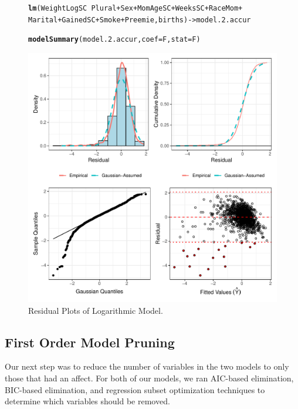 \documentclass{article}\usepackage[]{graphicx}\usepackage[]{xcolor}
\makeatletter
\def\maxwidth{ %
  \ifdim\Gin@nat@width>\linewidth
    \linewidth
  \else
    \Gin@nat@width
  \fi
}
\newcommand{\hlopt}[1]{\textcolor[rgb]{0,0,0}{#1}}%
\newcommand{\hlstd}[1]{\textcolor[rgb]{0.345,0.345,0.345}{#1}}%
\newcommand{\hlkwb}[1]{\textcolor[rgb]{0.69,0.353,0.396}{#1}}%
\newcommand{\hlkwc}[1]{\textcolor[rgb]{0.333,0.667,0.333}{#1}}%
\newcommand{\hlkwd}[1]{\textcolor[rgb]{0.737,0.353,0.396}{\textbf{#1}}}%
\newenvironment{kframe}{%
 \def\at@end@of@kframe{}%
 \ifinner\ifhmode%
  \def\at@end@of@kframe{\end{minipage}}%
  \begin{minipage}{\columnwidth}%
 \fi\fi%
 \def\FrameCommand##1{\hskip\@totalleftmargin \hskip-\fboxsep
 \colorbox{shadecolor}{##1}\hskip-\fboxsep
     \hskip-\linewidth \hskip-\@totalleftmargin \hskip\columnwidth}%
 \MakeFramed {\advance\hsize-\width
   \@totalleftmargin\z@ \linewidth\hsize
   \@setminipage}}%
 {\par\unskip\endMakeFramed%
 \at@end@of@kframe}
\newenvironment{knitrout}{}{} %
\makeatother
\begin{document}
\begin{figure}
\begin{knitrout}
\color{fgcolor}\begin{kframe}
\begin{alltt}
\hlkwd{lm}\hlstd{(WeightLogSC} \hlopt{~} \hlstd{Plural} \hlopt{+} \hlstd{Sex} \hlopt{+} \hlstd{MomAgeSC} \hlopt{+} \hlstd{WeeksSC} \hlopt{+} \hlstd{RaceMom} \hlopt{+}
     \hlstd{Marital} \hlopt{+} \hlstd{GainedSC} \hlopt{+} \hlstd{Smoke} \hlopt{+} \hlstd{Preemie, births)} \hlkwb{->} \hlstd{model.2.accur}

\hlkwd{modelSummary}\hlstd{(model.2.accur,} \hlkwc{coef}\hlstd{=F,} \hlkwc{stat}\hlstd{=F)}
\end{alltt}
\end{kframe}
\includegraphics[width=\maxwidth]{figure/unnamed-chunk-13-1} 
\end{knitrout}
\caption{Residual Plots of Logarithmic Model.} 
\label{resid.plots.log}
\end{figure}

\subsection{First Order Model Pruning}\label{fom.prune}

Our next step was to reduce the number of variables in the two models to only those that had an affect. For both of our models, we ran AIC-based elimination, BIC-based elimination, and regression subset optimization techniques to determine which variables should be removed.
\end{document}
